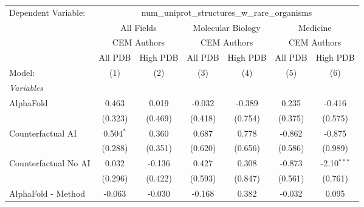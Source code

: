 \begingroup
\centering
\begin{tabular}{lcccccc}
   \tabularnewline \midrule \midrule
   Dependent Variable: & \multicolumn{6}{c}{num\_uniprot\_structures\_w\_rare\_organisms}\\
 & \multicolumn{2}{c}{All Fields} & \multicolumn{2}{c}{Molecular Biology} & \multicolumn{2}{c}{Medicine} \\
\cmidrule(lr){2-3} \cmidrule(lr){4-5} \cmidrule(lr){6-7}
 & \multicolumn{2}{c}{CEM Authors} & \multicolumn{2}{c}{CEM Authors} & \multicolumn{2}{c}{CEM Authors} \\
\cmidrule(lr){2-3} \cmidrule(lr){4-5} \cmidrule(lr){6-7}
 & \multicolumn{1}{c}{All PDB} & \multicolumn{1}{c}{High PDB} & \multicolumn{1}{c}{All PDB} & \multicolumn{1}{c}{High PDB} & \multicolumn{1}{c}{All PDB} & \multicolumn{1}{c}{High PDB} \\
\cmidrule(lr){2-2} \cmidrule(lr){3-3} \cmidrule(lr){4-4} \cmidrule(lr){5-5} \cmidrule(lr){6-6} \cmidrule(lr){7-7}
   Model:                                                     & (1)          & (2)         & (3)           & (4)           & (5)          & (6)\\  
   \midrule
   \emph{Variables}\\
   AlphaFold                                                  & 0.463        & 0.019       & -0.032        & -0.389        & 0.235        & -0.416\\   
                                                              & (0.323)      & (0.469)     & (0.418)       & (0.754)       & (0.375)      & (0.575)\\   
   Counterfactual AI                                          & 0.504$^{*}$  & 0.360       & 0.687         & 0.778         & -0.862       & -0.875\\   
                                                              & (0.288)      & (0.351)     & (0.620)       & (0.656)       & (0.586)      & (0.989)\\   
   Counterfactual No AI                                       & 0.032        & -0.136      & 0.427         & 0.308         & -0.873       & -2.10$^{***}$\\   
                                                              & (0.296)      & (0.422)     & (0.593)       & (0.847)       & (0.561)      & (0.761)\\   
   AlphaFold - Method                                         & -0.063       & -0.030      & -0.168        & 0.382         & -0.032       & 0.095\\   

\end{tabular}
